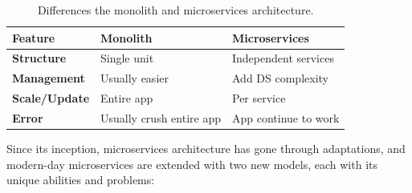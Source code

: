 \begin{table}[h!]
	\begin{center}
		\begin{tabular}{l|l|l}
			\textbf{Feature} & \textbf{Monolith} & \textbf{Microservices}\\
			\hline
			\textbf{Structure} & Single unit & Independent services \\
			\textbf{Management} & Usually easier & Add DS complexity\\
			\textbf{Scale/Update} & Entire app & Per service \\
			\textbf{Error} & Usually crush entire app & App continue to work \\
		\end{tabular}
	\end{center}
	\vspace{-0.5cm}
	\caption{Differences the monolith and microservices architecture.}
	\label{tab:table3}
\end{table}

\noindent
Since its inception, microservices architecture has gone through adaptations, and modern-day microservices are extended with two new models, each with its unique abilities and problems:

